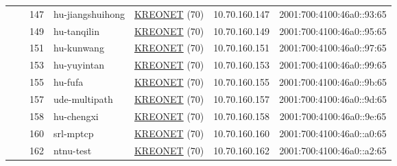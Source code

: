 \begin{small}
\begin{center}
\begin{longtable}{|c|c|c|c|c|c|c|c|}
  &  & \tiny{147} & \multicolumn{1}{|l|}{\tiny{hu-jiangshuihong}} & \multicolumn{2}{|c|}{\tiny{\href{http://www.kreonet.net}{KREONET} (70)}} & \tiny{10.70.160.147} & \tiny{2001:700:4100:46a0::93:65} \\* \cline{3-3}\cline{4-4}\cline{5-5}\cline{6-6}\cline{7-7}\cline{8-8}
  &  & \tiny{149} & \multicolumn{1}{|l|}{\tiny{hu-tanqilin}} & \multicolumn{2}{|c|}{\tiny{\href{http://www.kreonet.net}{KREONET} (70)}} & \tiny{10.70.160.149} & \tiny{2001:700:4100:46a0::95:65} \\* \cline{3-3}\cline{4-4}\cline{5-5}\cline{6-6}\cline{7-7}\cline{8-8}
  &  & \tiny{151} & \multicolumn{1}{|l|}{\tiny{hu-kunwang}} & \multicolumn{2}{|c|}{\tiny{\href{http://www.kreonet.net}{KREONET} (70)}} & \tiny{10.70.160.151} & \tiny{2001:700:4100:46a0::97:65} \\* \cline{3-3}\cline{4-4}\cline{5-5}\cline{6-6}\cline{7-7}\cline{8-8}
  &  & \tiny{153} & \multicolumn{1}{|l|}{\tiny{hu-yuyintan}} & \multicolumn{2}{|c|}{\tiny{\href{http://www.kreonet.net}{KREONET} (70)}} & \tiny{10.70.160.153} & \tiny{2001:700:4100:46a0::99:65} \\* \cline{3-3}\cline{4-4}\cline{5-5}\cline{6-6}\cline{7-7}\cline{8-8}
  &  & \tiny{155} & \multicolumn{1}{|l|}{\tiny{hu-fufa}} & \multicolumn{2}{|c|}{\tiny{\href{http://www.kreonet.net}{KREONET} (70)}} & \tiny{10.70.160.155} & \tiny{2001:700:4100:46a0::9b:65} \\* \cline{3-3}\cline{4-4}\cline{5-5}\cline{6-6}\cline{7-7}\cline{8-8}
  &  & \tiny{157} & \multicolumn{1}{|l|}{\tiny{ude-multipath}} & \multicolumn{2}{|c|}{\tiny{\href{http://www.kreonet.net}{KREONET} (70)}} & \tiny{10.70.160.157} & \tiny{2001:700:4100:46a0::9d:65} \\* \cline{3-3}\cline{4-4}\cline{5-5}\cline{6-6}\cline{7-7}\cline{8-8}
  &  & \tiny{158} & \multicolumn{1}{|l|}{\tiny{hu-chengxi}} & \multicolumn{2}{|c|}{\tiny{\href{http://www.kreonet.net}{KREONET} (70)}} & \tiny{10.70.160.158} & \tiny{2001:700:4100:46a0::9e:65} \\* \cline{3-3}\cline{4-4}\cline{5-5}\cline{6-6}\cline{7-7}\cline{8-8}
  &  & \tiny{160} & \multicolumn{1}{|l|}{\tiny{srl-mptcp}} & \multicolumn{2}{|c|}{\tiny{\href{http://www.kreonet.net}{KREONET} (70)}} & \tiny{10.70.160.160} & \tiny{2001:700:4100:46a0::a0:65} \\* \cline{3-3}\cline{4-4}\cline{5-5}\cline{6-6}\cline{7-7}\cline{8-8}
  &  & \tiny{162} & \multicolumn{1}{|l|}{\tiny{ntnu-test}} & \multicolumn{2}{|c|}{\tiny{\href{http://www.kreonet.net}{KREONET} (70)}} & \tiny{10.70.160.162} & \tiny{2001:700:4100:46a0::a2:65} \\* \cline{3-3}\cline{4-4}\cline{5-5}\cline{6-6}\cline{7-7}\cline{8-8}

\end{longtable}
\end{center}
\end{small}
